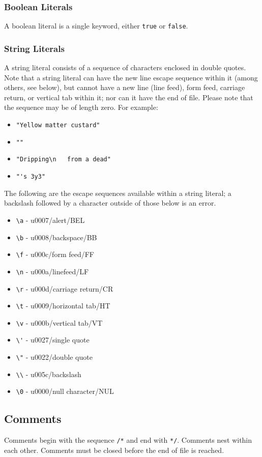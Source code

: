 \subsubsection{Boolean Literals}
A boolean literal is a single keyword, either \verb!true! or \verb!false!.

\subsubsection{String Literals}
A string literal consists of a sequence of characters enclosed in double quotes. Note that a string literal can have the new line escape sequence within it (among others, see below), but cannot have a new line (line feed), form feed, carriage return, or vertical tab within it; nor can it have the end of file. Please note that the sequence may be of length zero. For example:
\begin{itemize}
\item \verb!"Yellow matter custard"!
\item \verb!""!
\item \verb!"Dripping\n   from a dead"!
\item \verb!"'s 3y3"!
\end{itemize}

The following are the escape sequences available within a string literal; a backslash followed by a character outside of those below is an error.
\begin{itemize}
\item \verb!\a! - u0007/alert/BEL
\item \verb!\b! - u0008/backspace/BB
\item \verb!\f! - u000c/form feed/FF
\item \verb!\n! - u000a/linefeed/LF
\item \verb!\r! - u000d/carriage return/CR
\item \verb!\t! - u0009/horizontal tab/HT
\item \verb!\v! - u000b/vertical tab/VT
\item \verb!\'! - u0027/single quote
\item \verb!\"! - u0022/double quote
\item \verb!\\! - u005c/backslash
\item \verb!\0! - u0000/null character/NUL 
\end{itemize}

\subsection{Comments}
Comments begin with the sequence \verb!/*! and end with \verb!*/!. Comments nest within each other.  Comments must be closed before the end of file is reached.

